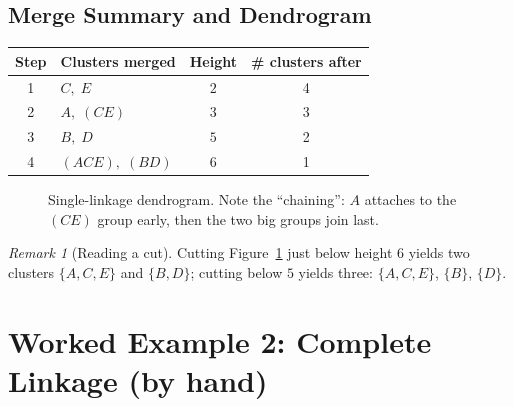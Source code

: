 \documentclass[11pt,a4paper]{report}
\theoremstyle{definition}
\theoremstyle{plain}
\theoremstyle{remark}
\newtheorem*{remark}{Remark}
\newcommand{\merge}[5]{%
  \draw[thick] (#1,#2) -- (#1,#5) -- (#3,#5) -- (#3,#4);
}
\begin{document}
\section{Merge Summary and Dendrogram}
\begin{center}
\begin{tabular}{@{}clcc@{}}
\toprule
Step & Clusters merged & Height & \# clusters after\\
\midrule
1 & $C,\;E$          & $2$ & 4\\
2 & $A,\;(CE)$       & $3$ & 3\\
3 & $B,\;D$          & $5$ & 2\\
4 & $(ACE),\;(BD)$   & $6$ & 1\\
\bottomrule
\end{tabular}
\end{center}

\begin{figure}[ht]
\centering
{}
\caption{Single-linkage dendrogram. Note the ``chaining'': $A$ attaches to the
$(CE)$ group early, then the two big groups join last.}
\label{fig:singdend}
\end{figure}

\begin{remark}[Reading a cut]
Cutting Figure~\ref{fig:singdend} just below height $6$ yields two clusters
$\{A,C,E\}$ and $\{B,D\}$; cutting below $5$ yields three: $\{A,C,E\}$,
$\{B\}$, $\{D\}$.
\end{remark}

\chapter{Worked Example 2: Complete Linkage (by hand)}
\label{ch:complete}
\end{document}
